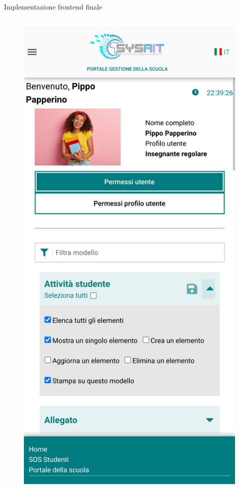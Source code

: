 \documentclass[11pt,xcolor={dvipsnames}]{beamer} %
\begin{document}
\begin{frame}{Implementazione frontend finale}
\begin{columns}[T]
\begin{column}{0.2\textwidth}
\begin{figure}
				\includegraphics[width=\textwidth]{../images/permission-management-mobile.png}
			\end{figure}
		\end{column}
	\end{columns}
\end{frame}
\end{document}
